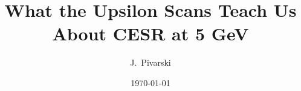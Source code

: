 \documentclass[aps,prd,preprint,superscriptaddress,tightenlines,nofootinbib,floatfix]{revtex4}
\begin{document}

\newcommand{\etal}{{\it et al.}}
\newcommand{\ee}{$e^+e^-$}
\newcommand{\mm}{$\mu^+\mu^-$}

\newcommand{\subs}[1]{{\mbox{\scriptsize #1}}}
\newcommand{\re}{\mathrm{Re\:}}
\newcommand{\gee}{$\Gamma_{ee}$}
\newcommand{\ups}{$\Upsilon$}
\newcommand{\uone}{$\Upsilon(1S)$}
\newcommand{\utwo}{$\Upsilon(2S)$}
\newcommand{\uthree}{$\Upsilon(3S)$}
\newcommand{\mpprec}{$m_\subs{$\pi\pi$-rec}$}
\newcommand{\bbar}{$b\bar{b}$}
\newcommand{\inv}{$^{-1}$}
\newcommand{\twotoone}{$\Upsilon(2S) \to \pi^+\pi^- \Upsilon(1S)$}
\newcommand{\pip}{$\pi^+\pi^-$}
\newcommand{\tautau}{$\tau^+\tau^-$}
\newcommand{\dxy}{$d_{XY}$}
\newcommand{\dz}{$d_Z$}



\title{What the Upsilon Scans Teach Us About CESR at 5 GeV}



\author{J.~Pivarski}
\noaffiliation



\date{\today}
\end{document}
